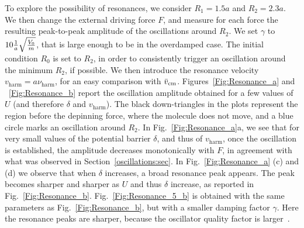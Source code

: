 To explore the possibility of resonances, we consider $R_1 = 1.5 a$ and $R_2 = 2.3 a$. We then change the external driving force $F$, and measure for each force the resulting peak-to-peak amplitude of the oscillations around $R_2$. We set $\gamma$ to $10 \frac{1}{a}\sqrt{\frac{V_0}{m}}$, that is large enough to be in the overdamped case. The initial condition $R_0$ is set to $R_2$, in order to consistently trigger an oscillation around the minimum $R_2$, if possible. We then introduce the resonance velocity $v_\text{harm} = a\nu_\text{harm}$, for an easy comparison with $\Bar{v}_\text{cm}$. Figures~\ref{Fig:Resonance_a} and ~\ref{Fig:Resonance_b} report the oscillation amplitude obtained for a few values of $U$ (and therefore $\delta$ and $v_\text{harm}$). The black down-triangles in the plots represent the region before the depinning force, where the molecule does not move, and a blue circle marks an oscillation around $R_2$. In Fig.~\ref{Fig:Resonance_a}a, we see that for very small values of the potential barrier $\delta$, and thus of $v_\text{harm}$, once the oscillation is established, the amplitude decreases monotonically with $F$, in agreement with what was observed in Section~\ref{oscillations:sec}. In Fig.~\ref{Fig:Resonance_a} (c) and (d) we observe that when $\delta$ increases, a broad resonance peak appears. The peak becomes sharper and sharper as $U$ and thus $\delta$ increase, as reported in Fig.~\ref{Fig:Resonance_b}. Fig.~\ref{Fig:Resonance_5_b} is obtained with the same parameters as Fig.~\ref{Fig:Resonance_b}, but with a smaller damping factor $\gamma$. Here the resonance peaks are sharper, because the oscillator quality factor is larger~\cite{Mazzoldi}. %

